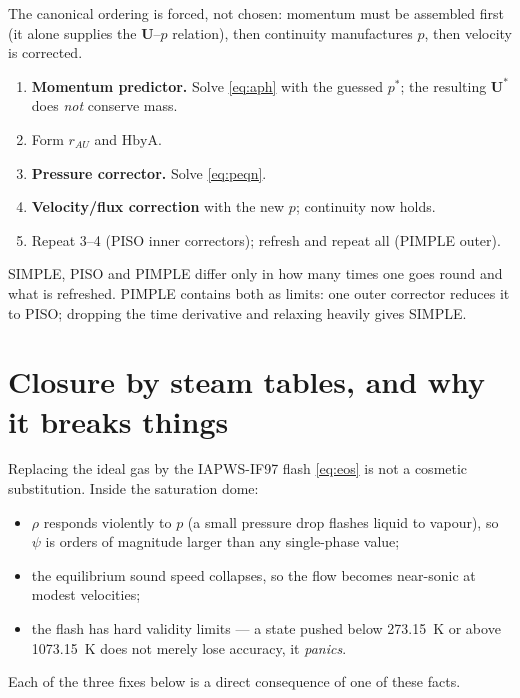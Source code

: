 \documentclass[11pt,a4paper]{article}
\newcommand{\uvec}{\mathbf{U}}
\begin{document}
\noindent The canonical ordering is forced, not chosen: momentum must be
assembled first (it alone supplies the $\uvec$--$p$ relation), then continuity
manufactures $p$, then velocity is corrected.

\begin{enumerate}[leftmargin=*]
  \item \textbf{Momentum predictor.} Solve \eqref{eq:aph} with the guessed
        $p^{*}$; the resulting $\uvec^{*}$ does \emph{not} conserve mass.
  \item Form $r_{AU}$ and $\mathrm{HbyA}$.
  \item \textbf{Pressure corrector.} Solve \eqref{eq:peqn}.
  \item \textbf{Velocity/flux correction} with the new $p$; continuity now holds.
  \item Repeat 3--4 (PISO inner correctors); refresh and repeat all (PIMPLE outer).
\end{enumerate}

SIMPLE, PISO and PIMPLE differ only in how many times one goes round and what is
refreshed. PIMPLE contains both as limits: one outer corrector reduces it to
PISO; dropping the time derivative and relaxing heavily gives SIMPLE.

\section{Closure by steam tables, and why it breaks things}\label{sec:closure}

Replacing the ideal gas by the IAPWS-IF97 flash \eqref{eq:eos} is not a cosmetic
substitution. Inside the saturation dome:

\begin{itemize}[leftmargin=*]
  \item $\rho$ responds violently to $p$ (a small pressure drop flashes liquid to
        vapour), so $\psi$ is orders of magnitude larger than any single-phase value;
  \item the equilibrium sound speed collapses, so the flow becomes near-sonic at
        modest velocities;
  \item the flash has hard validity limits --- a state pushed below
        \SI{273.15}{\kelvin} or above \SI{1073.15}{\kelvin} does not merely lose
        accuracy, it \emph{panics}.
\end{itemize}

Each of the three fixes below is a direct consequence of one of these facts.
\end{document}
